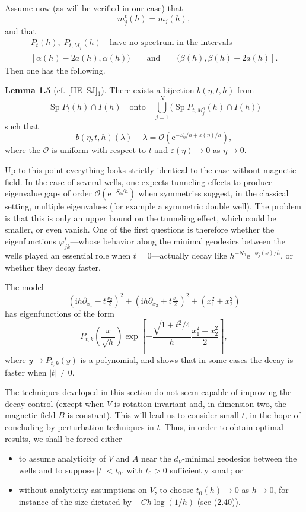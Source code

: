 \documentclass[11pt]{article}
\newcommand{\Sp}{\operatorname{Sp}}
\newcommand{\OO}{\mathcal O}
\newcommand{\ii}{\mathrm{i}}
\newcommand{\e}{\mathrm{e}}
\begin{document}
Assume now (as will be verified in our case) that
\begin{equation}
m_j^t(h)=m_j(h),
\tag{1.9}
\end{equation}
and that
\begin{equation}
\begin{gathered}
P_t(h),\;P_{t,M_j}(h)\quad\text{have no spectrum in the intervals}\\
[\alpha(h)-2a(h),\alpha(h))\qquad\text{and}\qquad
(\beta(h),\beta(h)+2a(h)].
\end{gathered}
\tag{1.10}
\end{equation}
Then one has the following.

\medskip
\noindent\textbf{Lemma 1.5} (cf. [HE--SJ]$_1$).
There exists a bijection $b(\eta,t,h)$ from
\[
\Sp P_t(h)\cap I(h)
\quad\text{onto}\quad
\bigcup_{j=1}^N\bigl(\Sp P_{t,M_j^\eta}(h)\cap I(h)\bigr)
\]
such that
\[
b(\eta,t,h)(\lambda)-\lambda
=\OO\!\left(\e^{-S_0/h+\varepsilon(\eta)/h}\right),
\]
where the $\OO$ is uniform with respect to $t$ and $\varepsilon(\eta)\to0$ as $\eta\to0$.

Up to this point everything looks strictly identical to the case without magnetic field. In the case of several wells, one expects tunneling effects to produce eigenvalue gaps of order $\OO(\e^{-S_0/h})$ when symmetries suggest, in the classical setting, multiple eigenvalues (for example a symmetric double well). The problem is that this is only an upper bound on the tunneling effect, which could be smaller, or even vanish. One of the first questions is therefore whether the eigenfunctions $\varphi_{jk}^t$---whose behavior along the minimal geodesics between the wells played an essential role when $t=0$---actually decay like $h^{-N_0}\e^{-\phi_j(x)/h}$, or whether they decay faster.

The model
\[
(\ii h\partial_{x_1}-t\tfrac{x_2}{2})^2
+(\ii h\partial_{x_2}+t\tfrac{x_1}{2})^2
+(x_1^2+x_2^2)
\]
has eigenfunctions of the form
\[
P_{t,k}\!\left(\frac{x}{\sqrt h}\right)
\exp\!\left[-\frac{\sqrt{1+t^2/4}}{h}\frac{x_1^2+x_2^2}{2}\right],
\]
where $y\mapsto P_{t,k}(y)$ is a polynomial, and shows that in some cases the decay is faster when $|t|\ne0$.

The techniques developed in this section do not seem capable of improving the decay control (except when $V$ is rotation invariant and, in dimension two, the magnetic field $B$ is constant). This will lead us to consider small $t$, in the hope of concluding by perturbation techniques in $t$. Thus, in order to obtain optimal results, we shall be forced either
\begin{itemize}[leftmargin=2em]
\item to assume analyticity of $V$ and $A$ near the $d_V$-minimal geodesics between the wells and to suppose $|t|<t_0$, with $t_0>0$ sufficiently small; or
\item without analyticity assumptions on $V$, to choose $t_0(h)\to0$ as $h\to0$, for instance of the size dictated by $-Ch\log(1/h)$ (see (2.40)).
\end{itemize}
\end{document}
